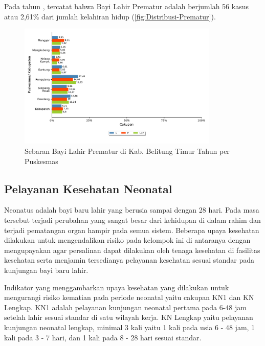 Pada tahun \tP, tercatat bahwa Bayi Lahir Prematur adalah berjumlah
56 kasus atau 2,61\% dari jumlah kelahiran hidup (\autoref{fig:Distribusi-Prematur}).

\begin{figure}[H]
	\centering
	\includegraphics[width=0.85\textwidth]{bab_05/bab_05_13a_Prematur}
	\caption{Sebaran Bayi Lahir Prematur di Kab. Belitung Timur Tahun \tP per Puskesmas}
	\label{fig:Distribusi-Prematur}
\end{figure}

\subsection{Pelayanan Kesehatan Neonatal}
Neonatus adalah bayi baru lahir yang berusia sampai dengan 28 hari.
Pada masa tersebut terjadi perubahan yang sangat besar dari kehidupan
di dalam rahim dan terjadi pematangan organ hampir pada semua sistem.
Beberapa upaya kesehatan dilakukan untuk mengendalikan risiko pada
kelompok ini di antaranya dengan mengupayakan agar persalinan dapat
dilakukan oleh tenaga kesehatan di fasilitas kesehatan serta menjamin
tersedianya pelayanan kesehatan sesuai standar pada kunjungan bayi
baru lahir.

Indikator yang menggambarkan upaya kesehatan yang dilakukan untuk
mengurangi risiko kematian pada periode neonatal yaitu cakupan KN1
dan KN Lengkap. KN1 adalah pelayanan kunjungan neonatal pertama pada
6-48 jam setelah lahir sesuai standar di satu wilayah kerja. KN Lengkap
yaitu pelayanan kunjungan neonatal lengkap, minimal 3 kali yaitu 1
kali pada usia 6 - 48 jam, 1 kali pada 3 - 7 hari, dan 1 kali pada
8 - 28 hari sesuai standar.


